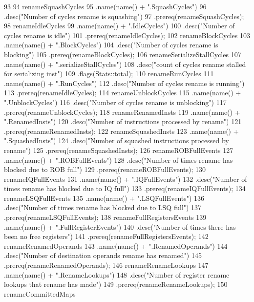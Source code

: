 \begin{DoxyCode}
93 {
94     renameSquashCycles
95         .name(name() + ".SquashCycles")
96         .desc("Number of cycles rename is squashing")
97         .prereq(renameSquashCycles);
98     renameIdleCycles
99         .name(name() + ".IdleCycles")
100         .desc("Number of cycles rename is idle")
101         .prereq(renameIdleCycles);
102     renameBlockCycles
103         .name(name() + ".BlockCycles")
104         .desc("Number of cycles rename is blocking")
105         .prereq(renameBlockCycles);
106     renameSerializeStallCycles
107         .name(name() + ".serializeStallCycles")
108         .desc("count of cycles rename stalled for serializing inst")
109         .flags(Stats::total);
110     renameRunCycles
111         .name(name() + ".RunCycles")
112         .desc("Number of cycles rename is running")
113         .prereq(renameIdleCycles);
114     renameUnblockCycles
115         .name(name() + ".UnblockCycles")
116         .desc("Number of cycles rename is unblocking")
117         .prereq(renameUnblockCycles);
118     renameRenamedInsts
119         .name(name() + ".RenamedInsts")
120         .desc("Number of instructions processed by rename")
121         .prereq(renameRenamedInsts);
122     renameSquashedInsts
123         .name(name() + ".SquashedInsts")
124         .desc("Number of squashed instructions processed by rename")
125         .prereq(renameSquashedInsts);
126     renameROBFullEvents
127         .name(name() + ".ROBFullEvents")
128         .desc("Number of times rename has blocked due to ROB full")
129         .prereq(renameROBFullEvents);
130     renameIQFullEvents
131         .name(name() + ".IQFullEvents")
132         .desc("Number of times rename has blocked due to IQ full")
133         .prereq(renameIQFullEvents);
134     renameLSQFullEvents
135         .name(name() + ".LSQFullEvents")
136         .desc("Number of times rename has blocked due to LSQ full")
137         .prereq(renameLSQFullEvents);
138     renameFullRegistersEvents
139         .name(name() + ".FullRegisterEvents")
140         .desc("Number of times there has been no free registers")
141         .prereq(renameFullRegistersEvents);
142     renameRenamedOperands
143         .name(name() + ".RenamedOperands")
144         .desc("Number of destination operands rename has renamed")
145         .prereq(renameRenamedOperands);
146     renameRenameLookups
147         .name(name() + ".RenameLookups")
148         .desc("Number of register rename lookups that rename has made")
149         .prereq(renameRenameLookups);
150     renameCommittedMaps
}
\end{DoxyCode}
